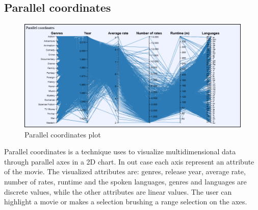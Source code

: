 \documentclass[]{article}
\begin{document}
\subsection{Parallel coordinates}
\begin{figure}[h!]
	\centering
	\includegraphics[width=1\linewidth]{images/parallel_plot}
	\caption{Parallel coordinates plot}
	\label{fig:parallelplot}
\end{figure}
Parallel coordinates is a technique uses to visualize multidimensional data through parallel axes in a 2D chart. In out case each axis represent an attribute of the movie.\newline
The visualized attributes are: genres, release year, average rate, number of rates, runtime and the spoken languages, genres and languages are discrete values, while the other attributes are linear values.\newline
The user can highlight a movie or makes a selection brushing a range selection on the axes.
\end{document}
